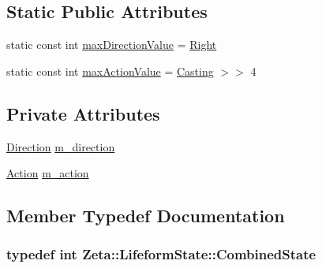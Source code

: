 \subsection*{Static Public Attributes}
\begin{DoxyCompactItemize}
\item 
static const int \hyperlink{classZeta_1_1LifeformState_a1d7a962e39e64266d685cce63e94774f}{max\+Direction\+Value} = \hyperlink{classZeta_1_1LifeformState_a63f770b2fa2c1d9b86b59108888d2806ab000dd815e34d2ef6ce88493b1a1f5eb}{Right}
\item 
static const int \hyperlink{classZeta_1_1LifeformState_a89d30f2c8086821c2d0346fcf867f473}{max\+Action\+Value} = \hyperlink{classZeta_1_1LifeformState_a965add1b0f9a548c9f3f9147b34b4816a817d466cbf3364cadb5310208800701c}{Casting} $>$$>$ 4
\end{DoxyCompactItemize}
\subsection*{Private Attributes}
\begin{DoxyCompactItemize}
\item 
\hyperlink{classZeta_1_1LifeformState_a63f770b2fa2c1d9b86b59108888d2806}{Direction} \hyperlink{classZeta_1_1LifeformState_a9d68e33fdffc2a4b3c9aded59895041f}{m\+\_\+direction}
\item 
\hyperlink{classZeta_1_1LifeformState_a965add1b0f9a548c9f3f9147b34b4816}{Action} \hyperlink{classZeta_1_1LifeformState_ae7fa763bada25f73ce0eb41995600ce1}{m\+\_\+action}
\end{DoxyCompactItemize}


\subsection{Member Typedef Documentation}
\hypertarget{classZeta_1_1LifeformState_a877fbe4e8efefd0a5323f950909181b6}{
\subsubsection[{Combined\+State}]{\setlength{\rightskip}{0pt plus 5cm}typedef int {\bf Zeta\+::\+Lifeform\+State\+::\+Combined\+State}}}\label{classZeta_1_1LifeformState_a877fbe4e8efefd0a5323f950909181b6}


